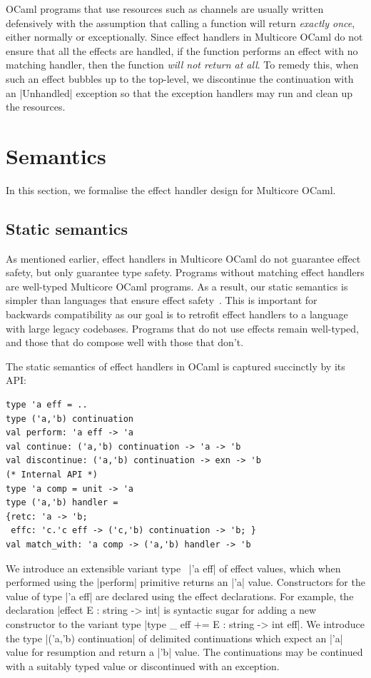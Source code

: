 \documentclass[sigplan,10pt,review,anonymous]{acmart}\settopmatter{printfolios=true,printccs=false,printacmref=false}
\begin{document}
OCaml programs that use resources such as channels are usually written defensively
with the assumption that calling a function will return \emph{exactly once},
either normally or exceptionally. Since effect handlers in Multicore OCaml do
not ensure that all the effects are handled, if the function performs an effect
with no matching handler, then the function \emph{will not return at all}. To
remedy this, when such an effect bubbles up to the top-level, we discontinue the
continuation with an |Unhandled| exception so that the exception handlers may
run and clean up the resources.

\section{Semantics}
\label{sec:semantics}

In this section, we formalise the effect handler design for Multicore OCaml.

\subsection{Static semantics}
\label{sec:static_semantics}

As mentioned earlier, effect handlers in Multicore OCaml do not guarantee
effect safety, but only guarantee type safety. Programs without matching effect
handlers are well-typed Multicore OCaml programs. As a result, our static
semantics is simpler than languages that ensure effect
safety~\cite{Eff,Hillerstrom20,Leijen14,Effekt,Frank,Biernacki19}. This is
important for backwards compatibility as our goal is to retrofit effect
handlers to a language with large legacy codebases. Programs that do not use
effects remain well-typed, and those that do compose well with those that
don't.

The static semantics of effect handlers in OCaml is captured succinctly by its
API:
\begin{lstlisting}
type 'a eff = ..
type ('a,'b) continuation
val perform: 'a eff -> 'a
val continue: ('a,'b) continuation -> 'a -> 'b
val discontinue: ('a,'b) continuation -> exn -> 'b
(* Internal API *)
type 'a comp = unit -> 'a
type ('a,'b) handler =
{retc: 'a -> 'b;
 effc: 'c.'c eff -> ('c,'b) continuation -> 'b; }
val match_with: 'a comp -> ('a,'b) handler -> 'b
\end{lstlisting}
We introduce an extensible variant type~\cite{ExtVariants} |'a eff| of effect
values, which when performed using the |perform| primitive returns an |'a|
value. Constructors for the value of type |'a eff| are declared using the
effect declarations. For example, the declaration |effect E : string -> int|
is syntactic sugar for adding a new constructor to the variant type
|type _ eff += E : string -> int eff|. We introduce the type
|('a,'b) continuation| of delimited continuations which expect an |'a| value for
resumption and return a |'b| value. The continuations may be continued with a
suitably typed value or discontinued with an exception.
\end{document}
